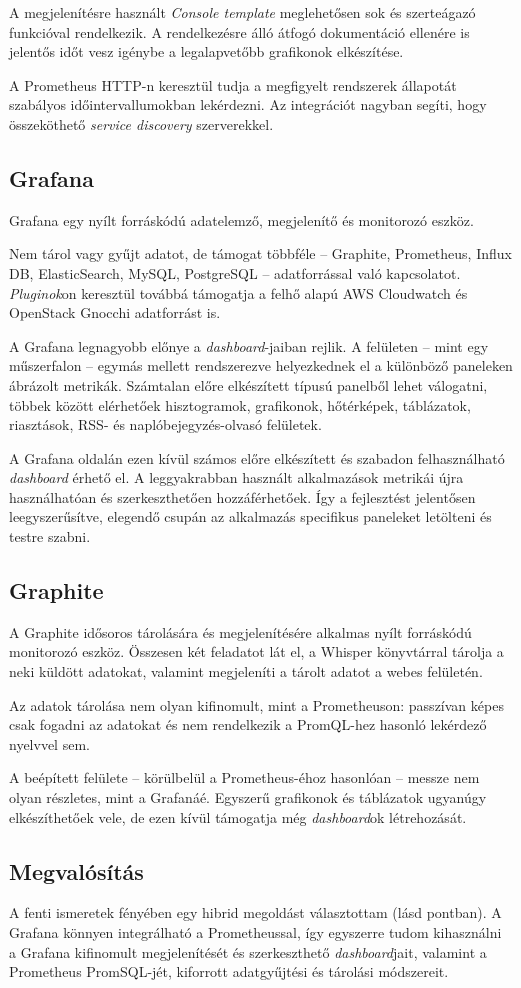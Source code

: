 A megjelenítésre használt \textit{Console template} meglehetősen sok és szerteágazó funkcióval rendelkezik. A rendelkezésre álló átfogó dokumentáció ellenére is jelentős időt vesz igénybe a legalapvetőbb grafikonok elkészítése.

A Prometheus HTTP-n keresztül tudja a megfigyelt rendszerek állapotát szabályos időintervallumokban lekérdezni. Az integrációt nagyban segíti, hogy összeköthető \textit{service discovery} szerverekkel.

\subsection{Grafana}
Grafana egy nyílt forráskódú adatelemző, megjelenítő és monitorozó eszköz.

Nem tárol vagy gyűjt adatot, de támogat többféle --  Graphite, Prometheus, Influx DB, ElasticSearch, MySQL, PostgreSQL --   adatforrással való kapcsolatot. \textit{Pluginok}on keresztül továbbá támogatja a felhő alapú AWS Cloudwatch és OpenStack Gnocchi adatforrást is.


A Grafana legnagyobb előnye a \textit{dashboard}-jaiban rejlik. A felületen --  mint egy műszerfalon --   egymás mellett rendszerezve helyezkednek el a különböző paneleken ábrázolt metrikák. Számtalan előre elkészített típusú panelből lehet válogatni, többek között elérhetőek hisztogramok, grafikonok, hőtérképek, táblázatok, riasztások, RSS- és naplóbejegyzés-olvasó felületek.

A Grafana oldalán ezen kívül számos előre elkészített és szabadon felhasználható \textit{dashboard} érhető el. A leggyakrabban használt alkalmazások metrikái újra használhatóan és szerkeszthetően hozzáférhetőek. Így a fejlesztést jelentősen leegyszerűsítve, elegendő csupán az alkalmazás specifikus paneleket letölteni és testre szabni.

\subsection{Graphite}
A Graphite idősoros tárolására és megjelenítésére alkalmas nyílt forráskódú monitorozó eszköz. Összesen két feladatot lát el, a Whisper könyvtárral tárolja a neki küldött adatokat, valamint megjeleníti a tárolt adatot a webes felületén.

Az adatok tárolása nem olyan kifinomult, mint a Prometheuson: passzívan képes csak fogadni az adatokat és nem rendelkezik a PromQL-hez hasonló lekérdező nyelvvel sem.

A beépített felülete --  körülbelül a Prometheus-éhoz hasonlóan --   messze nem olyan részletes, mint a Grafanáé. Egyszerű grafikonok és táblázatok ugyanúgy elkészíthetőek vele, de ezen kívül támogatja még \textit{dashboard}ok létrehozását.


\subsection{Megvalósítás}
A fenti ismeretek fényében egy hibrid megoldást választottam (lásd  pontban). A Grafana könnyen integrálható a Prometheussal, így egyszerre tudom kihasználni a Grafana kifinomult megjelenítését és szerkeszthető \textit{dashboard}jait, valamint a Prometheus PromSQL-jét, kiforrott adatgyűjtési és tárolási módszereit.